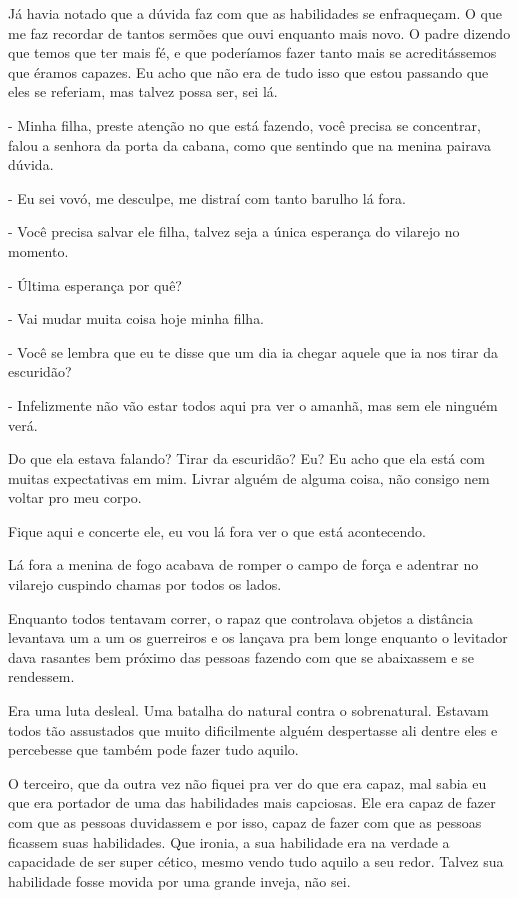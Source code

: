 Já havia notado que a dúvida faz com que as habilidades se enfraqueçam. O que me faz recordar de tantos sermões que ouvi enquanto mais novo. O padre dizendo que temos que ter mais fé, e que poderíamos fazer tanto mais se acreditássemos que éramos capazes. Eu acho que não era de tudo isso que estou passando que eles se referiam, mas talvez possa ser, sei lá.

- Minha filha, preste atenção no que está fazendo, você precisa se concentrar, falou a senhora da porta da cabana, como que sentindo que na menina pairava dúvida.

- Eu sei vovó, me desculpe, me distraí com tanto barulho lá fora.

- Você precisa salvar ele filha, talvez seja a única esperança do vilarejo no momento.

- Última esperança por quê?

- Vai mudar muita coisa hoje minha filha.

- Você se lembra que eu te disse que um dia ia chegar aquele que ia nos tirar da escuridão?

- Infelizmente não vão estar todos aqui pra ver o amanhã, mas sem ele ninguém verá.

Do que ela estava falando? Tirar da escuridão? Eu? Eu acho que ela está com muitas expectativas em mim. Livrar alguém de alguma coisa, não consigo nem voltar pro meu corpo.

Fique aqui e concerte ele, eu vou lá fora ver o que está acontecendo.

Lá fora a menina de fogo acabava de romper o campo de força e adentrar no vilarejo cuspindo chamas por todos os lados.

Enquanto todos tentavam correr, o rapaz que controlava objetos a distância levantava um a um os guerreiros e os lançava pra bem longe enquanto o levitador dava rasantes bem próximo das pessoas fazendo com que se abaixassem e se rendessem.

Era uma luta desleal. Uma batalha do natural contra o sobrenatural. Estavam todos tão assustados que muito dificilmente alguém despertasse ali dentre eles e percebesse que também pode fazer tudo aquilo.

O terceiro, que da outra vez não fiquei pra ver do que era capaz, mal sabia eu que era portador de uma das habilidades mais capciosas. Ele era capaz de fazer com que as pessoas duvidassem e por isso, capaz de fazer com que as pessoas ficassem suas habilidades. Que ironia, a sua habilidade era na verdade a capacidade de ser super cético, mesmo vendo tudo aquilo a seu redor. Talvez sua habilidade fosse movida por uma grande inveja, não sei.

